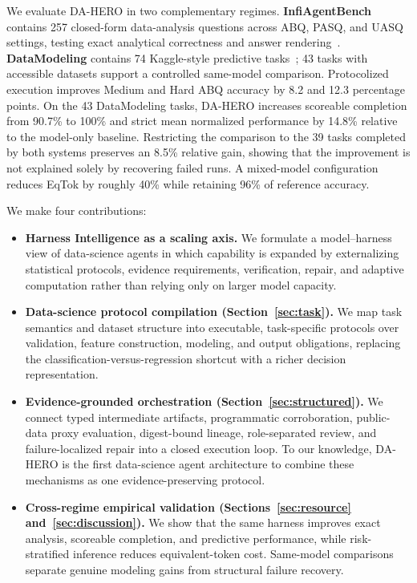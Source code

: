 \documentclass[letterpaper]{article} %
\begin{document}
We evaluate DA-HERO in two complementary regimes. \textbf{InfiAgentBench} contains 257 closed-form data-analysis questions across ABQ, PASQ, and UASQ settings, testing exact analytical correctness and answer rendering~\cite{infiagentbench}. \textbf{DataModeling} contains 74 Kaggle-style predictive tasks~\cite{kaggle}; 43 tasks with accessible datasets support a controlled same-model comparison. Protocolized execution improves Medium and Hard ABQ accuracy by 8.2 and 12.3 percentage points. On the 43 DataModeling tasks, DA-HERO increases scoreable completion from 90.7\% to 100\% and strict mean normalized performance by 14.8\% relative to the model-only baseline. Restricting the comparison to the 39 tasks completed by both systems preserves an 8.5\% relative gain, showing that the improvement is not explained solely by recovering failed runs. A mixed-model configuration reduces EqTok by roughly 40\% while retaining 96\% of reference accuracy.

We make four contributions:

\begin{itemize}
    \item \textbf{Harness Intelligence as a scaling axis.} We formulate a model--harness view of data-science agents in which capability is expanded by externalizing statistical protocols, evidence requirements, verification, repair, and adaptive computation rather than relying only on larger model capacity.
    \item \textbf{Data-science protocol compilation (Section~\ref{sec:task}).} We map task semantics and dataset structure into executable, task-specific protocols over validation, feature construction, modeling, and output obligations, replacing the classification-versus-regression shortcut with a richer decision representation.
    \item \textbf{Evidence-grounded orchestration (Section~\ref{sec:structured}).} We connect typed intermediate artifacts, programmatic corroboration, public-data proxy evaluation, digest-bound lineage, role-separated review, and failure-localized repair into a closed execution loop. To our knowledge, DA-HERO is the first data-science agent architecture to combine these mechanisms as one evidence-preserving protocol.
    \item \textbf{Cross-regime empirical validation (Sections~\ref{sec:resource} and~\ref{sec:discussion}).} We show that the same harness improves exact analysis, scoreable completion, and predictive performance, while risk-stratified inference reduces equivalent-token cost. Same-model comparisons separate genuine modeling gains from structural failure recovery.
\end{itemize}
\end{document}
